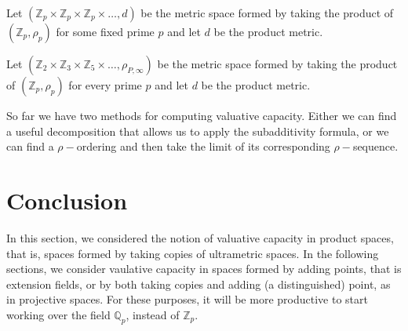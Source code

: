 \begin{example}
	Let $(\mathbb{Z}_p \times \mathbb{Z}_p \times \mathbb{Z}_p \times \ldots, d)$ be the metric space formed by taking the product of $(\mathbb{Z}_p, \rho_p)$ for some fixed prime $p$ and let $d$ be the product metric.
\end{example}

\begin{example}
	Let $(\mathbb{Z}_2 \times \mathbb{Z}_3 \times \mathbb{Z}_5 \times \ldots, \rho_{P,\infty})$ be the metric space formed by taking the product of $(\mathbb{Z}_p, \rho_p)$ for every prime $p$ and let $d$ be the product metric.
\end{example}

So far we have two methods for computing valuative capacity. Either we can find a useful decomposition that allows us to apply the subadditivity formula, or we can find a $\rho-$ordering and then take the limit of its corresponding $\rho-$sequence.


\section*{Conclusion}
In this section, we considered the notion of valuative capacity in product spaces, that is, spaces formed by taking copies of ultrametric spaces. In the following sections, we consider  vaulative capacity in spaces formed by adding points, that is extension fields, or by both taking copies and adding (a distinguished) point, as in projective spaces. For these purposes, it will be more productive to start working over the field $\mathbb{Q}_p$, instead of $\mathbb{Z}_p$.





































